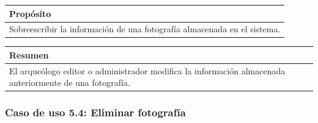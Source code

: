     \begin{table}[H]
        \centering
        \begin{tabularx}{\textwidth}{@{} |L |@{}} \hline
            \textbf{Propósito} \\
            \hline
            Sobreescribir la información de una fotografía almacenada en el sistema. \\
            \hline
        \end{tabularx}
    \end{table}

    \begin{table}[H]
        \centering
        \begin{tabularx}{\textwidth}{@{} |L |@{}} \hline
            \textbf{Resumen} \\
            \hline
            El arqueólogo editor o administrador modifica la información almacenada
            anteriormente de una fotografía.\\
            \hline
        \end{tabularx}
    \end{table}

\subsubsection{Caso de uso 5.4: Eliminar fotografía}

